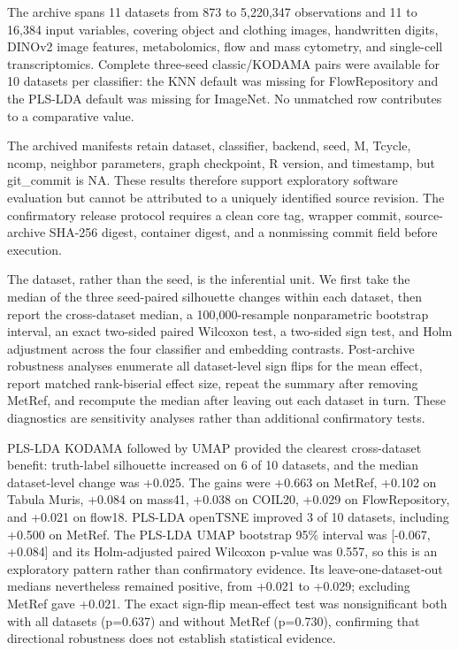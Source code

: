 \documentclass[twoside,11pt]{article}
\begin{document}
\begin{small}
The archive spans 11 datasets from 873 to 5,220,347 observations and 11 to 16,384 input variables, covering object and clothing images, handwritten digits, DINOv2 image features, metabolomics, flow and mass cytometry, and single-cell transcriptomics. Complete three-seed classic/KODAMA pairs were available for 10 datasets per classifier: the KNN default was missing for FlowRepository and the PLS-LDA default was missing for ImageNet. No unmatched row contributes to a comparative value.

The archived manifests retain dataset, classifier, backend, seed, M, Tcycle, ncomp, neighbor parameters, graph checkpoint, R version, and timestamp, but git\_commit is NA. These results therefore support exploratory software evaluation but cannot be attributed to a uniquely identified source revision. The confirmatory release protocol requires a clean core tag, wrapper commit, source-archive SHA-256 digest, container digest, and a nonmissing commit field before execution.

The dataset, rather than the seed, is the inferential unit. We first take the median of the three seed-paired silhouette changes within each dataset, then report the cross-dataset median, a 100,000-resample nonparametric bootstrap interval, an exact two-sided paired Wilcoxon test, a two-sided sign test, and Holm adjustment across the four classifier and embedding contrasts. Post-archive robustness analyses enumerate all dataset-level sign flips for the mean effect, report matched rank-biserial effect size, repeat the summary after removing MetRef, and recompute the median after leaving out each dataset in turn. These diagnostics are sensitivity analyses rather than additional confirmatory tests.

PLS-LDA KODAMA followed by UMAP provided the clearest cross-dataset benefit: truth-label silhouette increased on 6 of 10 datasets, and the median dataset-level change was +0.025. The gains were +0.663 on MetRef, +0.102 on Tabula Muris, +0.084 on mass41, +0.038 on COIL20, +0.029 on FlowRepository, and +0.021 on flow18. PLS-LDA openTSNE improved 3 of 10 datasets, including +0.500 on MetRef. The PLS-LDA UMAP bootstrap 95\% interval was [-0.067, +0.084] and its Holm-adjusted paired Wilcoxon p-value was 0.557, so this is an exploratory pattern rather than confirmatory evidence. Its leave-one-dataset-out medians nevertheless remained positive, from +0.021 to +0.029; excluding MetRef gave +0.021. The exact sign-flip mean-effect test was nonsignificant both with all datasets (p=0.637) and without MetRef (p=0.730), confirming that directional robustness does not establish statistical evidence.


\end{small}
\end{document}
